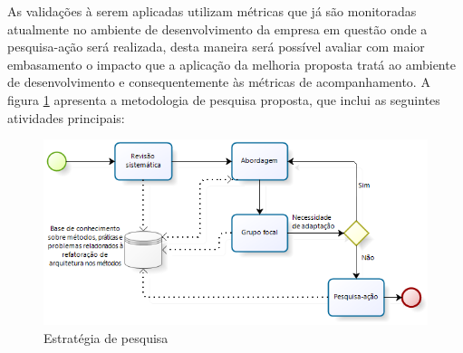 \begin{enumerate}[(a)]
    
    
\end{enumerate}

As validações à serem aplicadas utilizam métricas que já são monitoradas atualmente no ambiente de desenvolvimento da empresa em questão onde a pesquisa-ação será realizada, desta maneira será possível avaliar com maior embasamento o impacto que a aplicação da melhoria proposta tratá ao ambiente de desenvolvimento e consequentemente às métricas de acompanhamento. A figura \ref{fig:estrategia_pesquisa} apresenta a metodologia de pesquisa proposta, que inclui as seguintes atividades principais:
\begin{figure}[ht]
\centering
\includegraphics[scale=0.90]{figuras/estrategia_pesquisa}
\caption{ Estratégia de pesquisa}
\label{fig:estrategia_pesquisa}
\end{figure}

